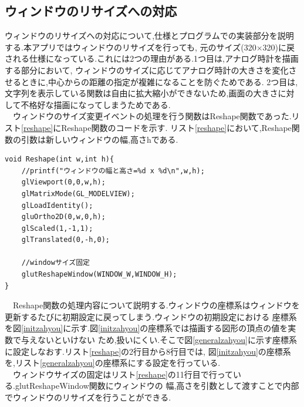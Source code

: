 \documentclass[a4j]{jarticle}
\begin{document}
  \subsection{ウィンドウのリサイズへの対応}
  ウィンドウのリサイズへの対応について,仕様とプログラムでの実装部分を説明する.本アプリではウィンドウのリサイズを行っても,
  元のサイズ(320$\times$320)に戻される仕様になっている.これには2つの理由がある.1つ目は,アナログ時計を描画する部分において,
  ウィンドウのサイズに応じてアナログ時計の大きさを変化させるときに,中心からの距離の指定が複雑になることを防ぐためである.
  2つ目は,文字列を表示している関数は自由に拡大縮小ができないため,画面の大きさに対して不格好な描画になってしまうためである.\\
  　ウィンドウのサイズ変更イベントの処理を行う関数はReshape関数であった.リスト\ref{reshape}にReshape関数のコードを示す.
  リスト\ref{reshape}において,Reshape関数の引数は新しいウィンドウの幅,高さhである.
  \begin{lstlisting}[basicstyle=\ttfamily\footnotesize, frame=single,label=reshape,caption=Reshape関数]
void Reshape(int w,int h){
    //printf("ウィンドウの幅と高さ=%d x %d\n",w,h);
    glViewport(0,0,w,h);
    glMatrixMode(GL_MODELVIEW);
    glLoadIdentity();
    gluOrtho2D(0,w,0,h);
    glScaled(1,-1,1);
    glTranslated(0,-h,0);

    //windowサイズ固定 
    glutReshapeWindow(WINDOW_W,WINDOW_H);
}    
      \end{lstlisting} 
      　Reshape関数の処理内容について説明する.ウィンドウの座標系はウィンドウを更新するたびに初期設定に戻ってしまう.ウィンドウの初期設定における
        座標系を図\ref{initzahyou}に示す.図\ref{initzahyou}の座標系では描画する図形の頂点の値を実数で与えないといけない
        ため,扱いにくい.そこで図\ref{generalzahyou}に示す座標系に設定しなおす.リスト\ref{reshape}の2行目から8行目では,
        図\ref{initzahyou}の座標系を,リスト\ref{generalzahyou}の座標系にする設定を行っている.\\
        　ウィンドウサイズの固定はリスト\ref{reshape}の11行目で行っている.glutReshapeWindow関数にウィンドウの
        幅,高さを引数として渡すことで内部でウィンドウのリサイズを行うことができる.
\end{document}
